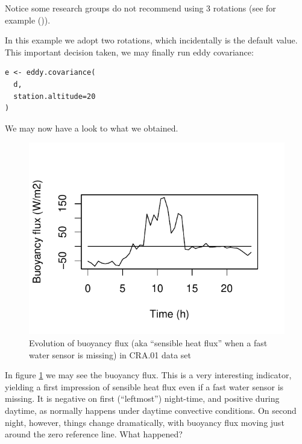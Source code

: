 \documentclass[a4paper,10pt]{book}
\begin{document}
Notice some research groups do not recommend using 3 rotations (see for example (\cite{Aubinet2012})).

In this example we adopt two rotations, which incidentally is the default value. This important decision taken, we may finally run eddy covariance:

\begin{verbatim}
e <- eddy.covariance(
  d,
  station.altitude=20
)
\end{verbatim}

We may now have a look to what we obtained.

\begin{figure}[htp]
 \centering
 \begin{center}
 \includegraphics[scale=1.1,keepaspectratio=true]{./diagrams/CRA01_H0v.pdf}
 \end{center}
 \caption{Evolution of buoyancy flux (aka ``sensible heat flux'' when a fast water sensor is missing) in CRA.01 data set}
 \label{fig:CRA.01 H0v}
\end{figure}

In figure \ref{fig:CRA.01 H0v} we may see the buoyancy flux. This is a very interesting indicator, yielding a first impression of sensible heat flux even if a fast water sensor is missing. It is negative on first (``leftmost'') night-time, and positive during daytime, as normally happens under daytime convective conditions. On second night, however, things change dramatically, with buoyancy flux moving just around the zero reference line. What happened?
\end{document}
